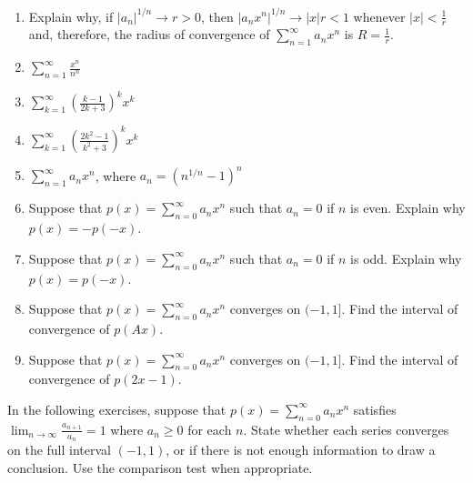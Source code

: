 \documentclass{exercises}
\begin{document}
\begin{enumerate}[resume]
\item Explain why, if ${|a_{n}|}^{1/n}\to r>0$, then ${|a_{n}x^{n}|}^{1/n}\to|x|r<1$ whenever $|x|<\frac{1}{r}$ and, therefore, the radius of convergence of $\sum_{n=1}^{\infty}a_{n}x^{n}$ is $R=\frac{1}{r}$.
\item $\sum_{n=1}^{\infty}\frac{x^{n}}{n^{n}}$
\item $\sum_{k=1}^{\infty}{(\frac{k-1}{2k+3})}^{k}x^{k}$
\item $\sum_{k=1}^{\infty}{(\frac{2k^{2}-1}{k^{2}+3})}^{k}x^{k}$
\item $\sum_{n=1}^{\infty}a_{n}x^{n}$, where $a_{n}={(n^{1/n}-1)}^{n}$
\item Suppose that $p(x)=\sum_{n=0}^{\infty}a_{n}x^{n}$ such that $a_{n}=0$ if $n$ is even. Explain why $p(x)=-p(-x)$.
\item Suppose that $p(x)=\sum_{n=0}^{\infty}a_{n}x^{n}$ such that $a_{n}=0$ if $n$ is odd. Explain why $p(x)=p(-x)$.
\item Suppose that $p(x)=\sum_{n=0}^{\infty}a_{n}x^{n}$ converges on $(-1,1]$. Find the interval of convergence of $p(Ax)$.
\item Suppose that $p(x)=\sum_{n=0}^{\infty}a_{n}x^{n}$ converges on $(-1,1]$. Find the interval of convergence of $p(2x-1)$.
\end{enumerate}

In the following exercises, suppose that $p(x)=\sum_{n=0}^{\infty}a_{n}x^{n}$ satisfies $\lim_{n\to \infty}\frac{a_{n+1}}{a_{n}}=1$ where $a_{n}\ge0$ for each $n$. State whether each series converges on the full interval $(-1,1)$, or if there is not enough information to draw a conclusion. Use the comparison test when appropriate.
\end{document}
